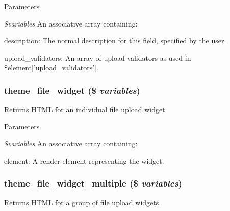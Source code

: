 \begin{DoxyParams}{Parameters}
\item[{\em \$variables}]An associative array containing:
\begin{DoxyItemize}
\item description: The normal description for this field, specified by the user.
\item upload\_\-validators: An array of upload validators as used in \$element\mbox{[}'upload\_\-validators'\mbox{]}. 
\end{DoxyItemize}\end{DoxyParams}
\hypertarget{group__themeable_ga9055faf2be0e1a9f7c75a5f981a4efa7}{
\subsubsection[{theme\_\-file\_\-widget}]{\setlength{\rightskip}{0pt plus 5cm}theme\_\-file\_\-widget (\$ {\em variables})}}
\label{group__themeable_ga9055faf2be0e1a9f7c75a5f981a4efa7}
Returns HTML for an individual file upload widget.


\begin{DoxyParams}{Parameters}
\item[{\em \$variables}]An associative array containing:
\begin{DoxyItemize}
\item element: A render element representing the widget. 
\end{DoxyItemize}\end{DoxyParams}
\hypertarget{group__themeable_ga56ddebb122d3e6e5a16783ccbf27fbfc}{
\subsubsection[{theme\_\-file\_\-widget\_\-multiple}]{\setlength{\rightskip}{0pt plus 5cm}theme\_\-file\_\-widget\_\-multiple (\$ {\em variables})}}
\label{group__themeable_ga56ddebb122d3e6e5a16783ccbf27fbfc}
Returns HTML for a group of file upload widgets.


